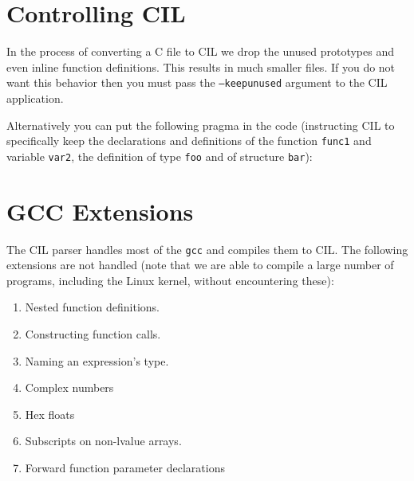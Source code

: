 \documentclass{article}
\def\t#1{{\tt #1}}
\begin{document}
\section{Controlling CIL}

 In the process of converting a C file to CIL we drop the unused prototypes
and even inline function definitions. This results in much smaller files. If
you do not want this behavior then you must pass the \t{--keepunused} argument
to the CIL application. 

 Alternatively you can put the following pragma in the code (instructing CIL
to specifically keep the declarations and definitions of the function
\t{func1} and variable \t{var2}, the definition of type \t{foo} and of
structure \t{bar}):



\section{GCC Extensions}

 The CIL parser handles most of the \t{gcc}
and compiles them to CIL. The following extensions are not handled (note that
we are able to compile a large number of programs, including the Linux kernel,
without encountering these):

\begin{enumerate}
\item Nested function definitions.
\item Constructing function calls.
\item Naming an expression's type.
\item Complex numbers
\item Hex floats
\item Subscripts on non-lvalue arrays.
\item Forward function parameter declarations
\end{enumerate}
\end{document}
